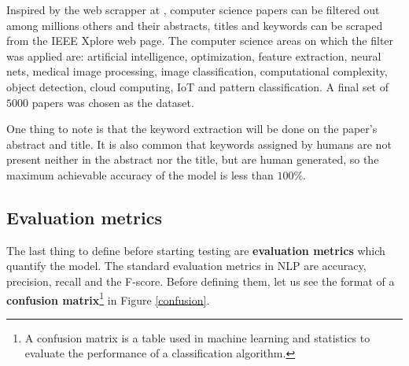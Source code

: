 \documentclass[12pt]{article}
\numberwithin{equation}{section}
\begin{document}
\begin{spacing}{1.5}
	Inspired by the web scrapper at \cite{scrapper}, computer science papers can be filtered out among millions others and their abstracts, titles and keywords can be scraped from the IEEE Xplore web page. The computer science areas on which the filter was applied are: artificial intelligence, optimization, feature extraction, neural nets, medical image processing, image classification, computational complexity, object detection, cloud computing, IoT and pattern classification. A final set of $5000$ papers was chosen as the dataset. 
	
	One thing to note is that the keyword extraction will be done on the paper's abstract and title. It is also common that keywords assigned by humans are not present neither in the abstract nor the title, but are human generated, so the maximum achievable accuracy of the model is less than $100 \%$.
	
	\subsection{Evaluation metrics}
	The last thing to define before starting testing are \textbf{evaluation metrics} which quantify the model. The standard evaluation metrics in NLP are accuracy, precision, recall and the F-score. Before defining them, let us see the format of a \textbf{confusion matrix}\footnote{A confusion matrix is a table used in machine learning and statistics to evaluate the performance of a classification algorithm.} in Figure \ref{confusion}.
	

\end{spacing}
\end{document}
